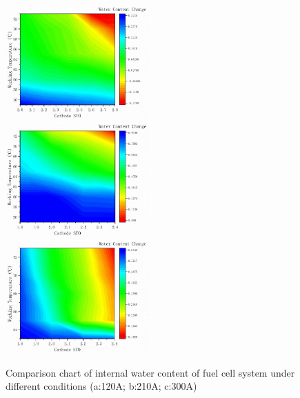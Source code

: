 \begin{figure}
	\label{fig:figure8}

		\label{fig:fig8a}
		\includegraphics[width=0.5\textwidth]{Research_pictures/fig8a.jpg}
		\label{fig:fig8b}
		\includegraphics[width=0.5\textwidth]{Research_pictures/fig8b.jpg}
		\label{fig:fig8c}
		\includegraphics[width=0.5\textwidth]{Research_pictures/fig8c.jpg}
	\caption{Comparison chart of internal water content of fuel cell system under different conditions (a:120A; b:210A; c:300A)}
\end{figure}

